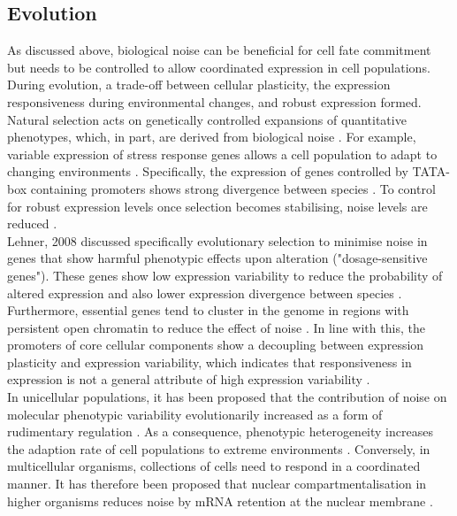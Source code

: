 \subsection{Evolution}

As discussed above, biological noise can be beneficial for cell fate commitment but needs to be controlled to allow coordinated expression in cell populations. 
During evolution, a trade-off between cellular plasticity, the expression responsiveness during environmental changes, and robust expression formed. 
Natural selection acts on genetically controlled expansions of quantitative phenotypes, which, in part, are derived from biological noise \citep{Eldar2010}. 
For example, variable expression of stress response genes allows a cell population to adapt to changing environments \citep{Lopez-Maury2009}. 
Specifically, the expression of genes controlled by TATA-box containing promoters shows strong divergence between species \citep{Tirosh2006}. 
To control for robust expression levels once selection becomes stabilising, noise levels are reduced \citep{Lopez-Maury2009, Eldar2010, Pires2016}. \\

Lehner, 2008 discussed specifically evolutionary selection to minimise noise in genes that show harmful phenotypic effects upon alteration ("dosage-sensitive genes"). 
These genes show low expression variability to reduce the probability of altered expression and also lower expression divergence between species \citep{Lehner2008}. 
Furthermore, essential genes tend to cluster in the genome in regions with persistent open chromatin to reduce the effect of noise \citep{Batada2007}. 
In line with this, the promoters of core cellular components show a decoupling between expression plasticity and expression variability, which indicates that responsiveness in expression is not a general attribute of high expression variability \citep{Lehner2010a}. \\

In unicellular populations, it has been proposed that the contribution of noise on molecular phenotypic variability evolutionarily increased as a form of rudimentary regulation \citep{Wolf2015}. 
As a consequence, phenotypic heterogeneity increases the adaption rate of cell populations to extreme environments \cite{Bodi2017}. 
Conversely, in multicellular organisms, collections of cells need to respond in a coordinated manner. 
It has therefore been proposed that nuclear compartmentalisation in higher organisms reduces noise by mRNA retention at the nuclear membrane \citep{Battich2013, Stoeger2016}.\\

